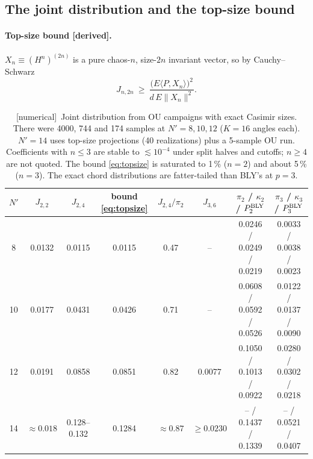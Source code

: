 \documentclass[11pt]{article}
\newcommand{\Np}{N'}
\newcommand{\tagbox}[2]{\textsf{\small\color{#1}[#2]}}
\newcommand{\DER}{\tagbox{cder}{derived}}
\newcommand{\NUM}{\tagbox{cnum}{numerical}}
\theoremstyle{remark}
\begin{document}
\subsection{The joint distribution and the top-size bound}
\paragraph{Top-size bound \DER.} $X_n\equiv(H^n)^{(2n)}$ is a pure chaos-$n$, size-$2n$ invariant vector, so by
Cauchy--Schwarz
\begin{equation}
J_{n,2n}\ \ge\ \frac{\big(E\langle P,X_n\rangle\big)^2}{d\,E\|X_n\|^2}.
\label{eq:topsize}
\end{equation}

\begin{table}[!htbp]
\centering\footnotesize
\setlength{\tabcolsep}{3.5pt}
\begin{tabular}{@{}cccccccc@{}}
\toprule
$\Np$ & $J_{2,2}$ & $J_{2,4}$ & bound \eqref{eq:topsize} & $J_{2,4}/\pi_2$ & $J_{3,6}$ & $\pi_2$ / $\kappa_2$ / $P_2^{\rm BLY}$ & $\pi_3$ / $\kappa_3$ / $P_3^{\rm BLY}$\\
\midrule
8 & 0.0132 & 0.0115 & 0.0115 & 0.47 & -- & 0.0246 / 0.0249 / 0.0219 & 0.0033 / 0.0038 / 0.0023\\
10 & 0.0177 & 0.0431 & 0.0426 & 0.71 & -- & 0.0608 / 0.0592 / 0.0526 & 0.0122 / 0.0137 / 0.0090\\
12 & 0.0191 & 0.0858 & 0.0851 & 0.82 & 0.0077 & 0.1050 / 0.1013 / 0.0922 & 0.0280 / 0.0302 / 0.0218\\
14 & $\approx0.018$ & 0.128--0.132 & 0.1284 & $\approx0.87$ & $\ge0.0230$ & -- / 0.1437 / 0.1339 & -- / 0.0521 / 0.0407\\
\bottomrule
\end{tabular}
\caption{\NUM\ Joint distribution from OU campaigns with exact Casimir sizes. There were 4000, 744 and 174 samples at
$\Np=8,10,12$ ($K=16$ angles each). $\Np=14$ uses top-size projections (40 realizations) plus a 5-sample OU run.
Coefficients with $n\le3$ are stable to $\lesssim10^{-4}$ under split halves and cutoffs; $n\ge4$ are not quoted.
The bound \eqref{eq:topsize} is saturated to 1\,\% ($n=2$) and about 5\,\% ($n=3$). The exact chord distributions are
fatter-tailed than BLY's at $p=3$.}
\label{tab:joint}
\end{table}
\end{document}

